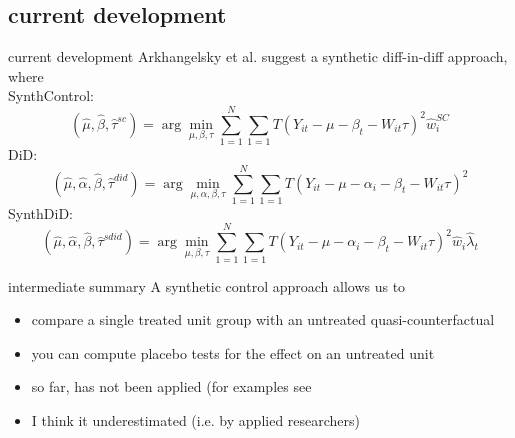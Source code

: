 \documentclass[aspectratio=169]{beamer}
\begin{document}
	\subsection{current development}
		\begin{frame}{current development}
			Arkhangelsky et al. \citeyear{Arkhangelsky2019} suggest a synthetic diff-in-diff approach, where \\ \vspace*{.15cm}
			SynthControl:
			\begin{equation}
				(\hat{\mu}, \hat{\beta}, \hat{\tau}^{sc}) = \arg\min_{\mu, \beta, \tau}  \sum_{1=1}^{N} \sum_{1=1}{T} \left(Y_{it} - \mu - \beta_t - W_{it}\tau \right)^2 \hat{w}_i^{SC}
			\end{equation}
			DiD:
			\begin{equation}
				(\hat{\mu}, \hat{\alpha}, \hat{\beta}, \hat{\tau}^{did}) = \arg\min_{\mu, \alpha, \beta, \tau}  \sum_{1=1}^{N} \sum_{1=1}{T} \left(Y_{it} - \mu - \alpha_i -\beta_t - W_{it}\tau \right)^2
			\end{equation}
			SynthDiD:
			\begin{equation}
				(\hat{\mu}, \hat{\alpha}, \hat{\beta}, \hat{\tau}^{sdid}) = \arg\min_{\mu, \beta, \tau}  \sum_{1=1}^{N} \sum_{1=1}{T} \left(Y_{it} - \mu - \alpha_i -\beta_t - W_{it}\tau \right)^2 \hat{w}_i \hat{\lambda}_t
			\end{equation}
		\end{frame}

		\begin{frame}{intermediate summary}
			A synthetic control approach allows us to \\ \vspace*{.5cm}
			\begin{itemize}
				\item compare a single treated unit group with an untreated quasi-counterfactual
				\item you can compute placebo tests for the effect on an untreated unit
				\item so far, has not been  applied (for examples see \cite{Abadie2020}
				\item I think it underestimated (i.e. by applied researchers)
			\end{itemize}
		\end{frame}
\end{document}
